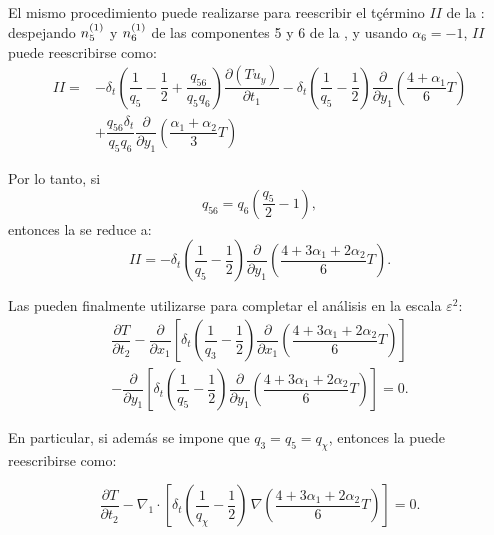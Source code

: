 El mismo procedimiento puede realizarse para reescribir el tçérmino $II$ de la : despejando $n_{5}^{(1)}$ y $n_{6}^{(1)}$ de las componentes 5 y 6 de la , y usando $\alpha_6=-1$, $II$ puede reescribirse como:
\begin{equation}
\begin{aligned}
	II =& -\delta_t \left( \dfrac{1}{q_5} - \dfrac{1}{2}  + \dfrac{q_{56}}{q_5 q_6}  \right) \dfrac{\partial (Tu_y)}{\partial t_1} - \delta_t \left( \dfrac{1}{q_5} - \dfrac{1}{2} \right) \dfrac{\partial}{\partial y_1} \left(\dfrac{4+\alpha_1}{6} T \right) \\
	&+ \dfrac{q_{56}\delta_t}{q_5q_6}\dfrac{\partial}{\partial y_1} \left(\dfrac{\alpha_1+\alpha_2}{3} T \right)
	\label{eq:II_0}
\end{aligned}
\end{equation}


Por lo tanto, si 
\begin{equation}
	q_{56} = q_6 \left( \dfrac{q_5}{2} - 1 \right),
\end{equation}
entonces la  se reduce a:
\begin{equation}
	II = -\delta_t \left( \dfrac{1}{q_5} - \dfrac{1}{2} \right) \dfrac{\partial}{\partial y_1} \left(\dfrac{4+3\alpha_1 + 2\alpha_2}{6} T \right).
	\label{eq:II_1}
\end{equation}

Las  pueden finalmente utilizarse para completar el an\'alisis en la escala $\varepsilon^2$:
\begin{equation}
	\begin{split}
	\dfrac{\partial T}{\partial t_2} -
	\dfrac{\partial}{\partial x_1}\left[ \delta_t \left( \dfrac{1}{q_3} - \dfrac{1}{2} \right) \dfrac{\partial}{\partial x_1} \left(\dfrac{4+3\alpha_1 + 2\alpha_2}{6} T \right) \right]	\\
	-  \dfrac{\partial}{\partial y_1}\left[ \delta_t \left( \dfrac{1}{q_5} - \dfrac{1}{2} \right) \dfrac{\partial}{\partial y_1} \left(\dfrac{4+3\alpha_1 + 2\alpha_2}{6} T \right) \right] = 0.
	\end{split}
	\label{eq:eps_2_clean}
\end{equation}

En particular, si adem\'as se impone que $q_3=q_5=q_{\chi}$, entonces la  puede reescribirse como:

\begin{equation}
	\dfrac{\partial T}{\partial t_2} - \nabla_1 \cdot \left[ \delta_t \left( \dfrac{1}{q_{\chi}} - \dfrac{1}{2} \right) \, \nabla\left( \dfrac{4+3\alpha_1 + 2\alpha_2}{6} T \right) \right]  = 0.
	\label{eq:T_eps_2}
\end{equation}

